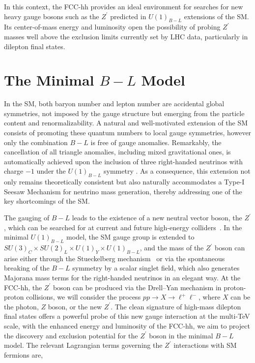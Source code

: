 \documentclass[aps,prev,twocolumn,preprintnumbers,floatfix,nofootinbib]{revtex4-1}
\begin{document}
In this context, the FCC-hh provides an ideal environment for searches for new heavy gauge bosons such as the $Z^\prime$ predicted in $U(1)_{B-L}$ extensions of the SM. Its center-of-mass energy and luminosity open the possibility of probing $Z^\prime$ masses well above the exclusion limits currently set by LHC data, particularly in dilepton final states. 
\section{The Minimal $B-L$ Model}
\label{blmodel}

In the SM, both baryon number and lepton number are accidental global symmetries, not imposed by the gauge structure but emerging from the particle content and renormalizability. A natural and well-motivated extension of the SM consists of promoting these quantum numbers to local gauge symmetries, however only the combination \( B-L \) is free of gauge anomalies. Remarkably, the cancellation of all triangle anomalies, including mixed gravitational ones, is automatically achieved upon the inclusion of three right-handed neutrinos with charge \(-1\) under the \( U(1)_{B-L} \) symmetry \cite{Arcadi:2023lwc}. As a consequence, this extension not only remains theoretically consistent but also naturally accommodates a Type-I Seesaw Mechanism for neutrino mass generation, thereby addressing one of the key shortcomings of the SM.

The gauging of \( B-L \) leads to the existence of a new neutral vector boson, the \( Z^\prime \), which can be searched for at current and future high-energy colliders~\cite{Pisano:1992bxx,Alves:2023vig,Robinett:1982gw,ATLAS:2019erb,RamirezBarreto:2010vji,Cogollo:2020afo}. In the minimal \( U(1)_{B-L} \) model, the SM gauge group is extended to \( SU(3)_C \times SU(2)_L \times U(1)_Y \times U(1)_{B-L} \), and the mass of the \( Z^\prime \) boson can arise either through the Stueckelberg mechanism~\cite{Ruegg:2003ps} or via the spontaneous breaking of the \( B-L \) symmetry by a scalar singlet field, which also generates Majorana mass terms for the right-handed neutrinos in an elegant way. 
At the FCC-hh, the $Z^\prime$ boson can be produced via the Drell–Yan mechanism in proton-proton collisions, we will consider the process $pp \rightarrow X \rightarrow \ell^+ \ell^-$, where $X$ can be the photon, $Z$ boson, or the new $Z^\prime$. The clean signature of high-mass dilepton final states offers a powerful probe of this new gauge interaction at the multi-TeV scale, with the enhanced energy and luminosity of the FCC-hh, we aim to project the discovery and exclusion potential for the $Z^\prime$ boson in the minimal $B-L$ model. The relevant Lagrangian terms governing the $Z^\prime$ interactions with SM fermions are, 
\end{document}

